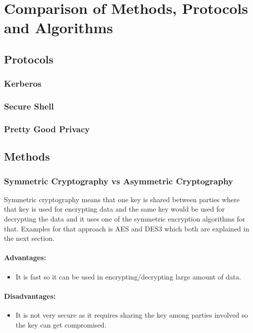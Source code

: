 \chapter{Comparison of Methods, Protocols and Algorithms}

\section{Protocols}

\subsection{Kerberos}
\subsection{Secure Shell}
\subsection{Pretty Good Privacy}

\section{Methods}

\subsection{Symmetric Cryptography vs Asymmetric Cryptography}
Symmetric cryptography means that one key is shared between parties where that key is used for encrypting data and the same key would be used for decrypting the data and it uses one of the symmetric encryption algorithms for that. Examples for that approach is AES and DES3 which both are explained in the next section.

\subsubsection{Advantages:}
\begin{itemize}
	\item It is fast so it can be used in encrypting/decrypting large amount of data.
\end{itemize}

\subsubsection{Disadvantages:}
\begin{itemize}
	\item It is not very secure as it requires sharing the key among parties involved so the key can get compromised.
\end{itemize}

